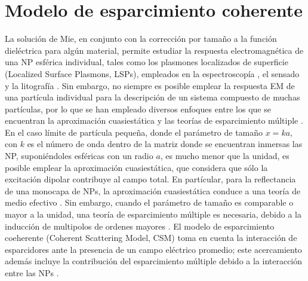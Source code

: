\section{Modelo de esparcimiento coherente}


La solución de Mie, en conjunto con la corrección por tamaño a la función dieléctrica para algún material, permite estudiar la respuesta electromagnética de una NP esférica individual, tales como los plasmones localizados de superficie (Localized Surface Plasmons, LSPs), empleados en la espectroscopía \cite{novotny2006principles}, el sensado \cite{jain2008noble} y la litografía \cite{stockman2011nanoplasmonics}. Sin embargo, no siempre es posible emplear la respuesta EM de una partícula individual para la descripción de un sistema compuesto de muchas partículas, por lo que se han empleado diversos enfoques entre los que se encuentran la aproximación cuasiestática y las teorías de esparcimiento múltiple \cite{pena-gomar2006coherent}. En el caso límite de partícula pequeña, donde el parámetro de tamaño $x=ka$, con $k$ es el número de onda dentro de la matriz donde se encuentran inmersas las NP, suponiéndoles esféricas con un radio $a$, es mucho menor que la unidad, es posible emplear  la aproximación cuasiestática, que considera que sólo la excitación dipolar contribuye al campo total. En partícular, para la reflectancia de una monocapa de NPs, la aproximación cuasiestática conduce a una teoría de medio efectivo \cite{pena-gomar2006coherent,barrera1991optical}. Sin embargo, cuando  el parámetro de tamaño es comparable o mayor a la unidad, una teoría de esparcimiento múltiple es necesaria, debido a la inducción de multipolos de ordenes mayores \cite{pena-gomar2006coherent}. El modelo de esparcimiento coeherente (Coherent Scattering Model, CSM) toma en cuenta la interacción de esparcidores ante la presencia de un campo eléctrico promedio; este acercamiento además incluye la contribución del esparcimiento múltiple debido a la interacción entre las NPs \cite{reyes2018analytical}.
    
